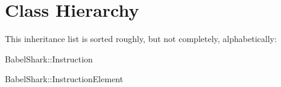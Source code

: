 \section{Class Hierarchy}
This inheritance list is sorted roughly, but not completely, alphabetically:\begin{CompactList}
\item BabelShark::Instruction\begin{CompactList}
\item BabelShark::InstructionElement\begin{CompactList}
\item {}
\end{CompactList}
\end{CompactList}
\end{CompactList}
